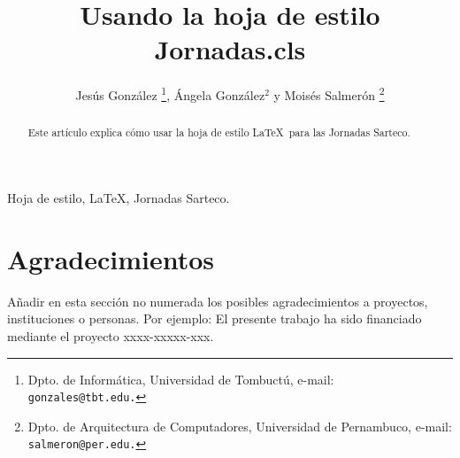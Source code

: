 \documentclass[twocolumn,twoside]{Jornadas}
\begin{document}
\title{Usando la hoja de estilo Jornadas.cls}

\author{%
     Jesús González%
     \thanks{Dpto. de Informática, Universidad de Tombuctú, e-mail: {\tt gonzales@tbt.edu.}},
     Ángela González$^2$ y Moisés Salmerón%
     \thanks{Dpto. de Arquitectura de Computadores, Universidad de Pernambuco, e-mail: {\tt salmeron@per.edu.}}
}

\maketitle
\markboth{}{}
\pagestyle{empty} 
\thispagestyle{empty} %

\begin{abstract}
Este artículo explica cómo usar la hoja de estilo \LaTeX\ para las
Jornadas Sarteco.
\end{abstract}

\begin{keywords}
Hoja de estilo, \LaTeX, Jornadas Sarteco.
\end{keywords}









\section*{Agradecimientos}

Añadir en esta sección no numerada los posibles agradecimientos a proyectos,
instituciones o personas. Por ejemplo: El presente trabajo ha sido financiado
mediante  el proyecto xxxx-xxxxx-xxx. 

\nocite{*}


\end{document}

